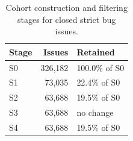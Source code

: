 \begin{table}[t]
\centering
\caption{Cohort construction and filtering stages for closed strict bug issues.\label{tab:stages}}
\small \begin{tabular}{@{}lrl@{}}
\toprule
Stage & Issues & Retained \\\midrule
S0 & 326,182 & 100.0\% of S0\\
S1 & 73,035 & 22.4\% of S0\\
S2 & 63,688 & 19.5\% of S0\\
S3 & 63,688 & no change\\
S4 & 63,688 & 19.5\% of S0\\
\bottomrule
\end{tabular}
\end{table}

